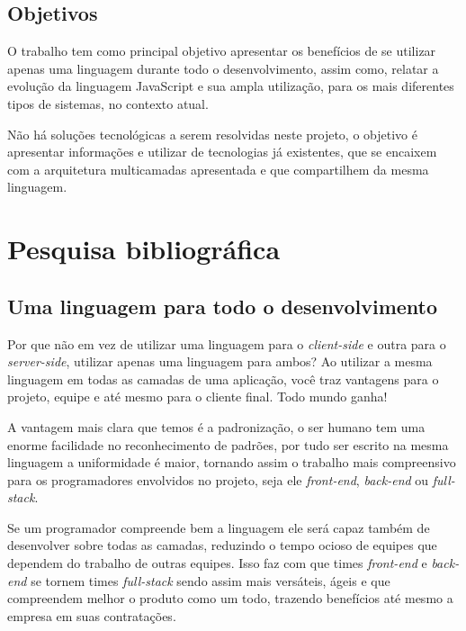 \documentclass[
	12pt,				%
	openright,			%
	twoside,			%
	a4paper,			%
	english,			%
	brazil				%
	]{abntex2}
\begin{document}
\section{Objetivos}

O trabalho tem como principal objetivo apresentar os benefícios de se utilizar apenas uma linguagem durante todo o desenvolvimento, assim como, relatar a evolução da linguagem JavaScript e sua ampla utilização, para os mais diferentes tipos de sistemas, no contexto atual.

Não há soluções tecnológicas a serem resolvidas neste projeto, o objetivo é apresentar informações e utilizar de tecnologias já existentes, que se encaixem com a arquitetura multicamadas apresentada e que compartilhem da mesma linguagem.

\chapter{Pesquisa bibliográfica}

\section{Uma linguagem para todo o desenvolvimento}
\label{sec:UmaLinguagemDesenvolvimento}

Por que não em vez de utilizar uma linguagem para o \textit{client-side} e outra para o \textit{server-side}, utilizar apenas uma linguagem para ambos? Ao utilizar a mesma linguagem em todas as camadas de uma aplicação, você traz vantagens para o projeto, equipe e até mesmo para o cliente final. Todo mundo ganha!

A vantagem mais clara que temos é a padronização, o ser humano tem uma enorme facilidade no reconhecimento de padrões, por tudo ser escrito na mesma linguagem a uniformidade é maior, tornando assim o trabalho mais compreensivo para os programadores envolvidos no projeto, seja ele \textit{front-end}, \textit{back-end} ou \textit{full-stack}. 

Se um programador compreende bem a linguagem ele será capaz também de desenvolver sobre todas as camadas, reduzindo o tempo ocioso de equipes que dependem do trabalho de outras equipes. Isso faz com que times \textit{front-end} e \textit{back-end} se tornem times \textit{full-stack} sendo assim mais versáteis, ágeis e que compreendem melhor o produto como um todo, trazendo benefícios até mesmo a empresa em suas contratações.
\end{document}
